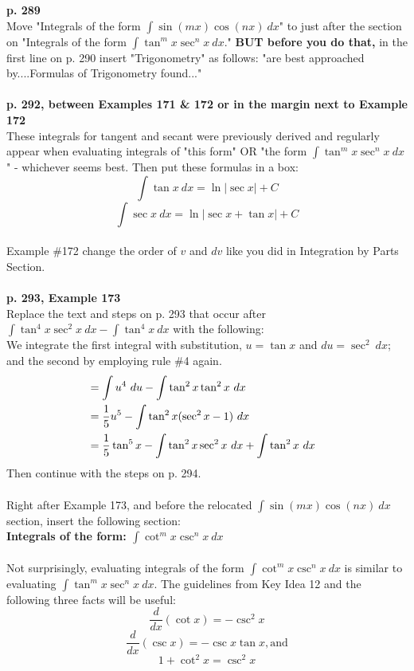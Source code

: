 \documentclass[11pt]{report}
\newcommand{\ds}{\displaystyle}
\begin{document}
\textbf{p. 289}\\
Move "Integrals of the form $\int \sin (mx) \cos (nx)~dx$" to just after the section on "Integrals of the form $\int \tan^m x \sec^n x~dx$." \textbf{BUT before you do that,} in the first line on p. 290 insert "Trigonometry" as follows: "are best approached by....Formulas of Trigonometry found..."\\ \\

\textbf{p. 292, between Examples 171 \& 172 or in the margin next to Example 172}\\ 
These integrals for tangent and secant were previously derived and regularly appear when evaluating integrals of "this form" {OR "the form $\int \tan^m x \sec^n x~dx$" - whichever seems best}. Then put these formulas in a box:
$$\int \tan x~dx = \ln |\sec x|+C$$
$$\int \sec x~dx = \ln |\sec x+\tan x|+C$$
\\

Example \#172 change the order of $v$ and $dv$ like you did in Integration by Parts Section. \\ \\

\textbf{p. 293, Example 173}\\ 
Replace the text and steps on p. 293 that occur after $\ds \int \tan^4 x \sec^2 x~dx - \int \tan^4 x~dx$ with the following:\\
We integrate the first integral with substitution, $u=\tan x$ and $du = \sec^2~dx$; and the second by employing rule \#4 again.
\begin{align}
&= \int u^4 ~du - \int \tan^2 x \tan^2 x ~dx \cr
&= \frac{1}{5} u^5 - \int \tan^2 x (\sec^2 x - 1)~dx\cr
&= \frac{1}{5} \tan^5 x - \int \tan^2 x \sec^2 x~dx + \int \tan^2 x~dx\cr
\end{align}
Then continue with the steps on p. 294.\\ \\

Right after Example 173, and before the relocated $\int \sin (mx) \cos (nx)~dx$ section, insert the following section:\\
\textbf{Integrals of the form: $\int \cot^m x \csc^n x~dx$}\\ \\
Not surprisingly, evaluating integrals of the form $\int \cot^m x \csc^n x~dx$ is similar to evaluating $\int \tan^m x \sec^n x~dx$. The guidelines from Key Idea 12 and the following three facts will be useful:\\
$$\frac{d}{dx}(\cot x) = - \csc^2 x$$
$$\frac{d}{dx}(\csc x) = - \csc x \tan x, \text{and}$$
$$1+\cot^2 x = \csc^2 x$$ 
\end{document}
